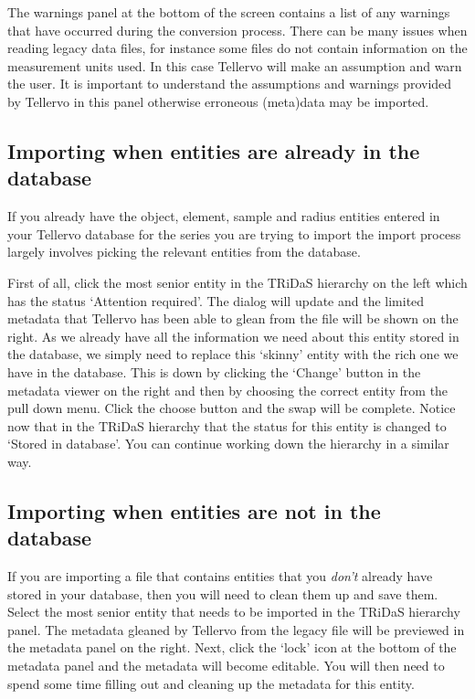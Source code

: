 The warnings panel at the bottom of the screen contains a list of any warnings that have occurred during the conversion process.  There can be many issues when reading legacy data files, for instance some files do not contain information on the measurement units used.  In this case Tellervo will make an assumption and warn the user.  It is important to understand the assumptions and warnings provided by Tellervo in this panel otherwise erroneous (meta)data may be imported.

\subsection{Importing when entities are already in the database}
If you already have the object, element, sample and radius entities entered in your Tellervo database for the series you are trying to import the import process largely involves picking the relevant entities from the database.  

First of all, click the most senior entity in the TRiDaS hierarchy on the left which has the status `Attention required'.  The dialog will update and the limited metadata that Tellervo has been able to glean from the file will be shown on the right.  As we already have all the information we need about this entity stored in the database, we simply need to replace this `skinny' entity with the rich one we have in the database.  This is down by clicking the `Change' button in the metadata viewer on the right and then by choosing the correct entity from the pull down menu.  Click the choose button and the swap will be complete.  Notice now that in the TRiDaS hierarchy that the status for this entity is changed to `Stored in database'.  You can continue working down the hierarchy in a similar way.

\subsection{Importing when entities are not in the database}
If you are importing a file that contains entities that you \emph{don't} already have stored in your database, then you will need to clean them up and save them.   Select the most senior entity that needs to be imported in the TRiDaS hierarchy panel.  The metadata gleaned by Tellervo from the legacy file will be previewed in the metadata panel on the right.  Next, click the `lock' icon at the bottom of the metadata panel and the metadata will become editable.  You will then need to spend some time filling out and cleaning up the metadata for this entity.  

